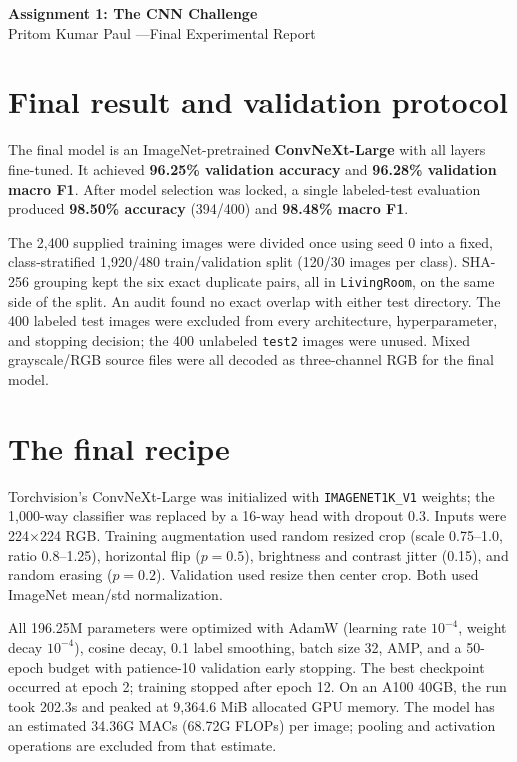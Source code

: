 \documentclass[10pt]{article}
\begin{document}
\pagestyle{plain}
\begin{center}
{\Large\bfseries Assignment 1: The CNN Challenge}\\[-1pt]
{\normalsize Pritom Kumar Paul \quad---\quad Final Experimental Report}
\end{center}
\vspace{-5pt}

\section*{Final result and validation protocol}
The final model is an ImageNet-pretrained \textbf{ConvNeXt-Large} with all
layers fine-tuned. It achieved \textbf{96.25\% validation accuracy} and
\textbf{96.28\% validation macro F1}. After model selection was locked, a
single labeled-test evaluation produced \textbf{98.50\% accuracy} (394/400)
and \textbf{98.48\% macro F1}.

The 2,400 supplied training images were divided once using seed 0 into a fixed,
class-stratified 1,920/480 train/validation split (120/30 images per class).
SHA-256 grouping kept the six exact duplicate pairs, all in \texttt{LivingRoom},
on the same side of the split. An audit found no exact overlap with either test
directory. The 400 labeled test images were excluded from every architecture,
hyperparameter, and stopping decision; the 400 unlabeled \texttt{test2} images
were unused. Mixed grayscale/RGB source files were all decoded as three-channel
RGB for the final model.

\section*{The final recipe}
Torchvision's ConvNeXt-Large was initialized with \texttt{IMAGENET1K\_V1}
weights; the 1,000-way classifier was replaced by a 16-way head with dropout
0.3. Inputs were 224$\times$224 RGB. Training augmentation used random resized
crop (scale 0.75--1.0, ratio 0.8--1.25), horizontal flip ($p=0.5$), brightness
and contrast jitter (0.15), and random erasing ($p=0.2$). Validation used resize
then center crop. Both used ImageNet mean/std normalization.

All 196.25M parameters were optimized with AdamW (learning rate $10^{-4}$,
weight decay $10^{-4}$), cosine decay, 0.1 label smoothing, batch size 32, AMP,
and a 50-epoch budget with patience-10 validation early stopping. The best
checkpoint occurred at epoch 2; training stopped after epoch 12. On an A100
40GB, the run took 202.3s and peaked at 9,364.6 MiB allocated GPU memory. The
model has an estimated 34.36G MACs (68.72G FLOPs) per image; pooling and
activation operations are excluded from that estimate.
\end{document}
